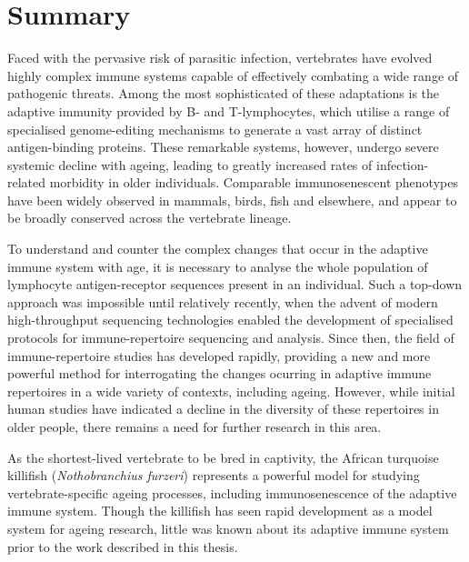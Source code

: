 
\section*{Summary} %

Faced with the pervasive risk of parasitic infection, vertebrates have evolved highly complex immune systems capable of effectively combating a wide range of pathogenic threats. Among the most sophisticated of these adaptations is the adaptive immunity provided by B- and T-lymphocytes, which utilise a range of specialised genome-editing mechanisms to generate a vast array of distinct antigen-binding proteins. These remarkable systems, however, undergo severe systemic decline with ageing, leading to greatly increased rates of infection-related morbidity in older individuals. Comparable immunosenescent phenotypes have been widely observed in mammals, birds, fish and elsewhere, and appear to be broadly conserved across the vertebrate lineage.

To understand and counter the complex changes that occur in the adaptive immune system with age, it is necessary to analyse the whole population of lymphocyte antigen-receptor sequences present in an individual. Such a top-down approach was impossible until relatively recently, when the advent of modern high-throughput sequencing technologies enabled the development of specialised protocols for immune-repertoire sequencing and analysis. Since then, the field of immune-repertoire studies has developed rapidly, providing a new and more powerful method for interrogating the changes ocurring in adaptive immune repertoires in a wide variety of contexts, including ageing. However, while initial human studies have indicated a decline in the diversity of these repertoires in older people, there remains a need for further research in this area. %

As the shortest-lived vertebrate to be bred in captivity, the African turquoise killifish (\textit{Nothobranchius furzeri}) represents a powerful model for studying vertebrate-specific ageing processes, including immunosenescence of the adaptive immune system. Though the killifish has seen rapid development as a model system for ageing research, little was known about its adaptive immune system prior to the work described in this thesis. %